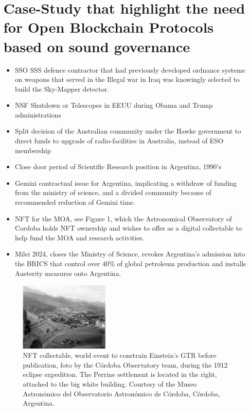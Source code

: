 \documentclass[final,5p,times,twocolumn,authoryear]{elsarticle}
\begin{document}
\section{Case-Study that highlight the need for Open Blockchain Protocols based on sound governance}
\label{sec:btc5}

\begin{itemize}
    \item{SSO SSS defence contractor that had previously developed ordnance systems on weapons that served in the Illegal war in Iraq was knowingly selected to build the Sky-Mapper detector. } 
    \item{NSF Shutdown or Telescopes in EEUU during Obama and Trump administrations}
    \item{Split decision of the Australian community under the Hawke government to direct funds to upgrade of radio-facilities in Australia, instead of ESO membership}
    \item{Close door period of Scientific Research position in Argentina, 1990's}
    \item{Gemini contractual issue for Argentina, implicating a withdraw of funding from the ministry of science, and a divided community because of recommended reduction of Gemini time.}
    \item{NFT for the MOA}, see Figure 1, which the Astronomical Observatory of Cordoba holds NFT ownership and wishes to offer as a digital collectable to help fund the MOA and research activities.
    \item{Milei 2024}, closes the Ministry of Science, revokes Argentina's admission into the BRICS that control over 40\% of global petroleum production and installs Austerity measures onto Argentina. 

\end{itemize}


\begin{figure}[ht!]
    \centering
    \label{fig:my_label}
  \caption{NFT collectable, world event to constrain Einstein's GTR before publication, foto by the C\'ordoba Observatory team,
during the 1912 eclipse expedition. The Perrine settlement is located in the right, attached to the big white building. Courtesy of the Museo Astron\'omico del Observatorio Astron\'omico de C\'ordoba, C\'ordoba, Argentina.}
  \includegraphics[width=0.4\textwidth]{figs/p1912.eps}
\end{figure}
\end{document}
